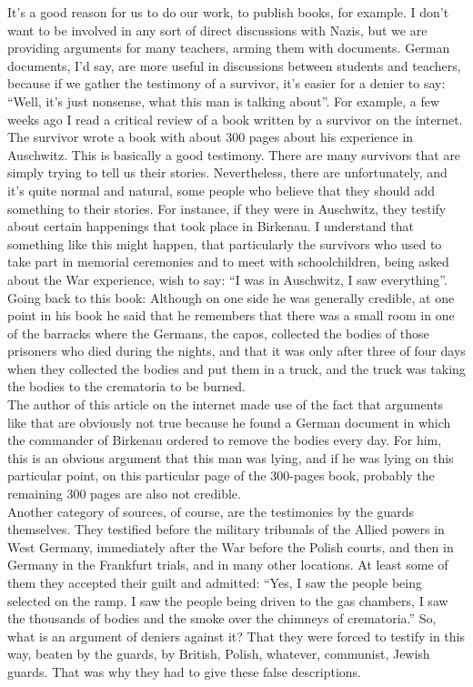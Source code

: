 It's a good reason for us to do our work, to publish books, for example. I don’t want to be involved in any sort of direct discussions with Nazis, but we are providing arguments for many teachers, arming them with documents. German documents, I'd say, are more useful in discussions between students and teachers, because if we gather the testimony of a survivor, it’s easier for a denier to say: ``Well, it’s just nonsense, what this man is talking about''. For example, a few weeks ago I read a critical review of a book written by a survivor on the internet. The survivor wrote a book with about 300 pages about his experience in Auschwitz. This is basically a good testimony. There are many survivors that are simply trying to tell us their stories. Nevertheless, there are unfortunately, and it's quite normal and natural, some people who believe that they should add something to their stories. For instance, if they were in Auschwitz, they testify about certain happenings that took place in Birkenau. I understand that something like this might happen, that particularly the survivors who used to take part in memorial ceremonies and to meet with schoolchildren, being asked about the War experience, wish to say: ``I was in Auschwitz, I saw everything''.\\
Going back to this book: Although on one side he was generally credible, at one point in his book he said that he remembers that there was a small room in one of the barracks where the Germans, the capos, collected the bodies of those prisoners who died during the nights, and that it was only after three of four days when they collected the bodies and put them in a truck, and the truck was taking the bodies to the crematoria to be burned.\\
The author of this article on the internet made use of the fact that arguments like that are obviously not true because he found a German document in which the commander of Birkenau ordered to remove the bodies every day. For him, this is an obvious argument that this man was lying, and if he was lying on this particular point, on this particular page of the 300-pages book, probably the remaining 300 pages are also not credible.\\
Another category of sources, of course, are the testimonies by the guards themselves. They testified before the military tribunals of the Allied powers in West Germany, immediately after the War before the Polish courts, and then in Germany in the Frankfurt trials, and in many other locations. At least some of them they accepted their guilt and admitted: ``Yes, I saw the people being selected on the ramp. I saw the people being driven to the gas chambers, I saw the thousands of bodies and the smoke over the chimneys of crematoria.'' So, what is an argument of deniers against it? That they were forced to testify in this way, beaten by the guards, by British, Polish, whatever, communist, Jewish guards. That was why they had to give these false descriptions. \\
